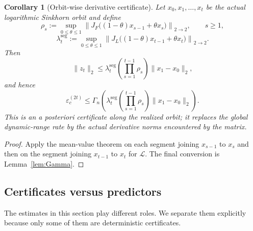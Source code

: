 \documentclass[11pt]{article}
\numberwithin{equation}{section}
\theoremstyle{plain}
\newtheorem{corollary}[theorem]{Corollary}
\theoremstyle{definition}
\theoremstyle{remark}
\begin{document}
\begin{corollary}[Orbit-wise derivative certificate]\label{cor:orbitwise-certificate}
Let $x_0,x_1,\dots,x_t$ be the actual logarithmic Sinkhorn orbit and define
\[
        \rho_s
        :=
        \sup_{0\le\theta\le1}
        \left\|
        J_F\big((1-\theta)x_{s-1}+\theta x_s\big)
        \right\|_{2\to2},
        \qquad s\ge1,
\]
\[
        \lambda_t^{\mathrm{seg}}
        :=
        \sup_{0\le\theta\le1}
        \left\|
        J_L\big((1-\theta)x_{t-1}+\theta x_t\big)
        \right\|_{2\to2}.
\]
Then
\begin{equation}\label{eq:orbitwise-log-cert}
        \|z_t\|_2
        \le
        \lambda_t^{\mathrm{seg}}
        \left(\prod_{s=1}^{t-1}\rho_s\right)
        \|x_1-x_0\|_2,
\end{equation}
and hence
\begin{equation}\label{eq:orbitwise-eps-cert}
        \varepsilon_c^{(2t)}
        \le
        \Gamma_n\!\left(
        \lambda_t^{\mathrm{seg}}
        \left(\prod_{s=1}^{t-1}\rho_s\right)
        \|x_1-x_0\|_2
        \right).
\end{equation}
This is an a posteriori certificate along the realized orbit; it replaces the global dynamic-range rate by the actual derivative norms encountered by the matrix.
\end{corollary}

\begin{proof}
Apply the mean-value theorem on each segment joining $x_{s-1}$ to $x_s$ and then on the segment joining $x_{t-1}$ to $x_t$ for $\mathcal L$. The final conversion is Lemma~\ref{lem:Gamma}.
\end{proof}

\subsection{Certificates versus predictors}
\label{subsec:certificates-versus-predictors}

The estimates in this section play different roles.  We separate them explicitly
because only some of them are deterministic certificates.
\end{document}
